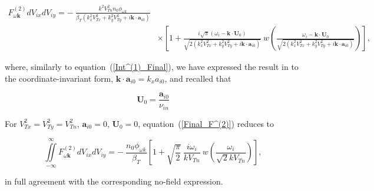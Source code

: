 \documentclass[draft]{agujournal2019}
\renewcommand{\vec}{\mathbf}
\begin{document}
{\begin{linenomath*}
\begin{align}
F_{\omega\vec{k}}^{(2)}dV_{ix}dV_{iy}=-\ \frac{k^{2}V_{Tn}^{2}n_{0}%
\phi_{\omega k}}{\beta_{T}(k_{x}^{2}V_{Tx}^{2}+k_{y}%
^{2}V_{Ty}^{2}+i\vec{k}\cdot\vec{a}_{i0})}\nonumber\\
&  \times\left[  1+\frac{i\sqrt{\pi}(\omega_{i}-\vec{k}\cdot\vec{U}_{0})}%
{\sqrt{2(k_{x}^{2}V_{Tx}^{2}+k_{y}^{2}V_{Ty}^{2}%
+i\vec{k}\cdot\vec{a}_{i0})}}\ w\left(  \frac{\omega_{i}-\vec{k}\cdot\vec{U}%
_{0}}{\sqrt{2(k_{x}^{2}V_{Tx}^{2}+k_{y}^{2}V_{Ty}%
^{2}+i\vec{k}\cdot\vec{a}_{i0})}}\right)  \right]  , 
\label{Final_F^(2)}%
\end{align}
\end{linenomath*}
where, similarly to equation~(\ref{Int^(1)_Final}), we have expressed the
result in to the coordinate-invariant form, $\vec{k}\cdot\vec{a}_{i0}=k_{x}a_{i0}$,
and recalled that
\begin{linenomath*}
\begin{equation}
\vec{U}_{0}=\frac{\vec{a}_{i0}}{\nu_{in}} 
\label{U_0=a_0/nu_i}
\end{equation}
\end{linenomath*}


For $V_{Tx}^{2}=V_{Ty}^{2}=V_{Tn}^{2}$, $\vec{a}_{i0}=0$, $\vec{U}_{0}=0$,
equation~(\ref{Final_F^(2)}) reduces to
\begin{linenomath*}
\begin{equation}
{\displaystyle\iint\limits_{-\infty}^{\infty}}
F_{\omega\vec{k}}^{(2)}dV_{ix}dV_{iy}=-\ \frac{n_{0}\phi_{\omega k}}{\beta
_{T}}\left[  1+\sqrt{\frac{\pi}{2}}\ \frac{i\omega_{i}}{kV_{Tn}}\ w\left(
\frac{\omega_{i}}{\sqrt{2}kV_{Tn}}\right)  \right]  , 
\label{agrees}
\end{equation}
\end{linenomath*}
in full agreement with the corresponding no-field expression.

}
\end{document}
